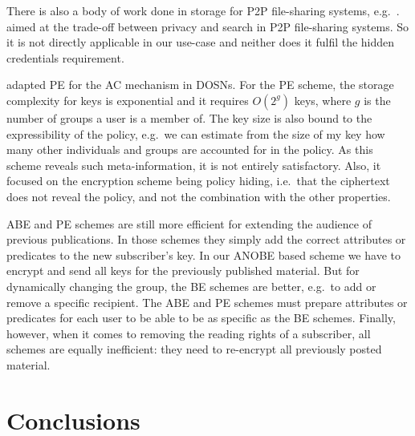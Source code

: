 There is also a body of work done in storage for \ac{P2P} file-sharing systems, 
e.g.~\cite{TunableACinP2P}.
\citet{TunableACinP2P} aimed at the trade-off between privacy and search in 
\ac{P2P} file-sharing systems.
So it is not directly applicable in our use-case and neither does it fulfil the 
hidden credentials requirement.


\citet{PEAC} adapted \ac{PE} for the \ac{AC} mechanism in \acp{DOSN}.
For the \ac{PE} scheme, the storage complexity for keys is exponential and it 
requires \(O(2^g)\) keys, where \(g\) is the number of groups a user is 
a member of.
The key size is also bound to the expressibility of the policy, e.g.\ we can 
estimate from the size of my key how many other individuals and groups are 
accounted for in the policy.
As this scheme reveals such meta-information, it is not entirely satisfactory.
Also, it focused on the encryption scheme being policy hiding, i.e.\ that the 
ciphertext does not reveal the policy, and not the combination with the other 
properties.

\Ac{ABE} and \ac{PE} schemes are still more efficient for extending the 
audience of previous publications.
In those schemes they simply add the correct attributes or predicates to the 
new subscriber's key.
In our \ac{ANOBE} based scheme we have to encrypt and send all keys for the 
previously published material.
But for dynamically changing the group, the \ac{BE} schemes are better, e.g.\ 
to add or remove a specific recipient.
The \ac{ABE} and \ac{PE} schemes must prepare attributes or predicates for each 
user to be able to be as specific as the \ac{BE} schemes.
Finally, however, when it comes to removing the reading rights of a subscriber, 
all schemes are equally inefficient: they need to re-encrypt all previously 
posted material.


\section{Conclusions}\label{sec:Conclusions}

